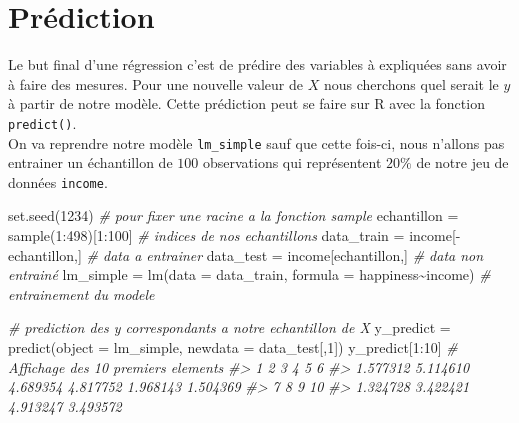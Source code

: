 \documentclass[
]{book}
\newenvironment{Shaded}{\begin{snugshade}}{\end{snugshade}}
\newcommand{\AttributeTok}[1]{\textcolor[rgb]{0.77,0.63,0.00}{#1}}
\newcommand{\CommentTok}[1]{\textcolor[rgb]{0.56,0.35,0.01}{\textit{#1}}}
\newcommand{\DecValTok}[1]{\textcolor[rgb]{0.00,0.00,0.81}{#1}}
\newcommand{\FunctionTok}[1]{\textcolor[rgb]{0.00,0.00,0.00}{#1}}
\newcommand{\NormalTok}[1]{#1}
\newcommand{\OtherTok}[1]{\textcolor[rgb]{0.56,0.35,0.01}{#1}}
\newcommand{\SpecialCharTok}[1]{\textcolor[rgb]{0.00,0.00,0.00}{#1}}
\begin{document}
\hypertarget{pruxe9diction}{%
\section{Prédiction}\label{pruxe9diction}}

Le but final d'une régression c'est de prédire des variables à
expliquées sans avoir à faire des mesures. Pour une nouvelle valeur de
\(X\) nous cherchons quel serait le \(y\) à partir de notre modèle.
Cette prédiction peut se faire sur R avec la fonction \texttt{predict()}.\\
On va reprendre notre modèle \texttt{lm\_simple} sauf que cette fois-ci, nous
n'allons pas entrainer un échantillon de \(100\) observations qui
représentent \(20\%\) de notre jeu de données \texttt{income}.

\begin{Shaded}
\begin{Highlighting}[]
\FunctionTok{set.seed}\NormalTok{(}\DecValTok{1234}\NormalTok{) }\CommentTok{\# pour fixer une racine a la fonction sample}
\NormalTok{echantillon }\OtherTok{=} \FunctionTok{sample}\NormalTok{(}\DecValTok{1}\SpecialCharTok{:}\DecValTok{498}\NormalTok{)[}\DecValTok{1}\SpecialCharTok{:}\DecValTok{100}\NormalTok{] }\CommentTok{\# indices de nos echantillons}
\NormalTok{data\_train }\OtherTok{=}\NormalTok{ income[}\SpecialCharTok{{-}}\NormalTok{echantillon,] }\CommentTok{\# data a entrainer}
\NormalTok{data\_test }\OtherTok{=}\NormalTok{ income[echantillon,] }\CommentTok{\# data non entrainé}
\NormalTok{lm\_simple }\OtherTok{=} \FunctionTok{lm}\NormalTok{(}\AttributeTok{data =}\NormalTok{ data\_train, }\AttributeTok{formula =}\NormalTok{ happiness}\SpecialCharTok{\textasciitilde{}}\NormalTok{income) }\CommentTok{\# entrainement du modele}
\end{Highlighting}
\end{Shaded}

\begin{Shaded}
\begin{Highlighting}[]
\CommentTok{\# prediction des y correspondants a notre echantillon de X}
\NormalTok{y\_predict }\OtherTok{=} \FunctionTok{predict}\NormalTok{(}\AttributeTok{object =}\NormalTok{ lm\_simple, }\AttributeTok{newdata =}\NormalTok{ data\_test[,}\DecValTok{1}\NormalTok{])}
\NormalTok{y\_predict[}\DecValTok{1}\SpecialCharTok{:}\DecValTok{10}\NormalTok{] }\CommentTok{\# Affichage des 10 premiers elements }
\CommentTok{\#\textgreater{}        1        2        3        4        5        6 }
\CommentTok{\#\textgreater{} 1.577312 5.114610 4.689354 4.817752 1.968143 1.504369 }
\CommentTok{\#\textgreater{}        7        8        9       10 }
\CommentTok{\#\textgreater{} 1.324728 3.422421 4.913247 3.493572}
\end{Highlighting}
\end{Shaded}
\end{document}
